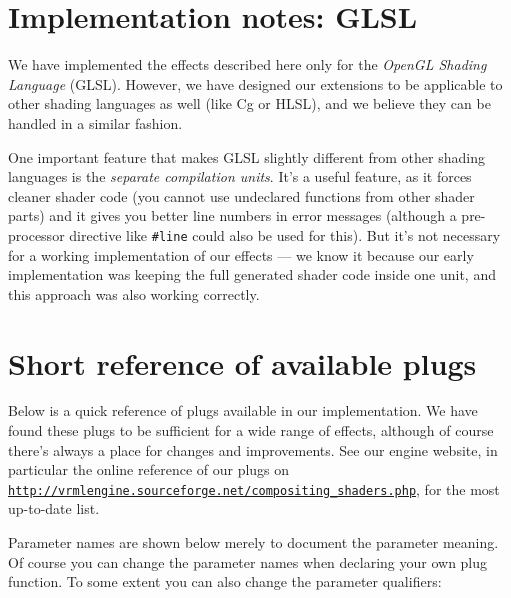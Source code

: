 \documentclass{acmsiggraph}                     %
\newcommand*{\myhref}[2]{\texttt{\href{#1}{\nolinkurl{#2}}}}
\begin{document}
\section{Implementation notes: GLSL}

We have implemented the effects described here only for the
\emph{OpenGL Shading Language} (GLSL). However, we have designed our extensions
to be applicable to other shading languages as well (like Cg or HLSL),
and we believe they can be handled in a similar fashion.

One important feature that makes GLSL slightly different from other
shading languages is the \emph{separate compilation units}.
It's a useful feature, as it forces
cleaner shader code (you cannot use undeclared functions from other
shader parts) and it gives you better line numbers in error messages
(although a pre-processor directive like \texttt{\#line} could also be used for
this). But it's not necessary for a working implementation of our effects
--- we know it because our early implementation was keeping
the full generated shader code inside one unit, and this approach
was also working correctly.

\section{Short reference of available plugs}

Below is a quick reference of plugs available in our
implementation. We have found these plugs to be sufficient for a wide
range of effects, although of course there's always a place for
changes and improvements. See our engine website,
in particular the online reference of our plugs on
\myhref{http://vrmlengine.sourceforge.net/compositing\_shaders.php}{http://vrmlengine.sourceforge.net/compositing_shaders.php},
for the most up-to-date list.

Parameter names are shown below merely to document the parameter
meaning. Of course you can change the parameter names when declaring
your own plug function. To some extent you can also change the parameter
qualifiers:
\end{document}
